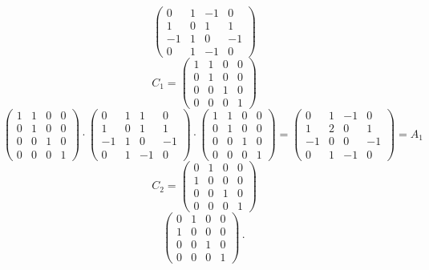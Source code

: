 \documentclass[a4paper]{article}
\theoremstyle{definition}
\begin{document}
\[
  \begin{pmatrix}
    0 & 1 & -1 & 0 \\
    1 & 0 & 1 & 1 \\
    -1 & 1 & 0 & -1 \\
    0 & 1 & -1 & 0
  \end{pmatrix}
\] \[
  C_1 = \begin{pmatrix}
    1 & 1 & 0 & 0 \\
    0 & 1 & 0 & 0 \\
    0 & 0 & 1 & 0 \\
    0 & 0 & 0 & 1
  \end{pmatrix}
\] \[
  \begin{pmatrix}
    1 & 1 & 0 & 0 \\
    0 & 1 & 0 & 0 \\
    0 & 0 & 1 & 0 \\
    0 & 0 & 0 & 1
  \end{pmatrix}
  \cdot
  \begin{pmatrix}
    0 & 1 & 1 & 0 \\
    1 & 0 & 1 & 1 \\
    -1 & 1 & 0 & -1 \\
    0 & 1 & -1 & 0
  \end{pmatrix}
  \cdot
  \begin{pmatrix}
    1 & 1 & 0 & 0 \\
    0 & 1 & 0 & 0 \\
    0 & 0 & 1 & 0 \\
    0 & 0 & 0 & 1
  \end{pmatrix}
  =
  \begin{pmatrix}
    0 & 1 & -1 & 0 \\
    1 & 2 & 0 & 1 \\
    -1 & 0 & 0 & -1 \\
    0 & 1 & -1 & 0
  \end{pmatrix}
  = A_1
\] \[
  C_2 = \begin{pmatrix}
    0 & 1 & 0 & 0 \\
    1 & 0 & 0 & 0 \\
    0 & 0 & 1 & 0 \\
    0 & 0 & 0 & 1
  \end{pmatrix}
\] \[
  \begin{pmatrix}
    0 & 1 & 0 & 0 \\
    1 & 0 & 0 & 0 \\
    0 & 0 & 1 & 0 \\
    0 & 0 & 0 & 1
  \end{pmatrix}
  \cdot
\]
\end{document}
